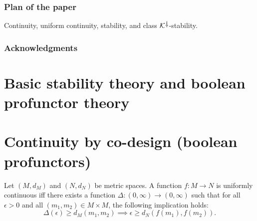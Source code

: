 \documentclass[11pt, one side, article]{memoir}
\theoremstyle{definition}
\theoremstyle{plain}
\newcommand{\cat}[1]{\mathcal{#1}}%
\newcommand{\ldag}{^{\rotatebox{180}{$\dagger$}}}
\newcommand{\K}{\cat{K}}
\newcommand{\Kdag}[1][0]{\K\ldag}
\begin{document}
\subsection{Plan of the paper}

Continuity, 
uniform continuity, 
stability, and
class $\Kdag$-stability.

\subsection*{Acknowledgments}



\chapter{Basic stability theory and boolean profunctor theory}
\label{chap.stability_and_profunctors}

\chapter{Continuity by co-design (boolean profunctors)}
\label{}

Let $(M,d_M)$ and $(N,d_N)$ be metric spaces. A function $f\colon M\to N$ is uniformly continuous iff there exists a function $\Delta\colon(0,\infty)\to(0,\infty)$ such that for all $\epsilon>0$ and all $(m_1,m_2)\in M\times M$, the following implication holds:
\[
\Delta(\epsilon)\geq d_M(m_1,m_2)\implies
\epsilon\geq d_N(f(m_1),f(m_2)).
\]
\end{document}
